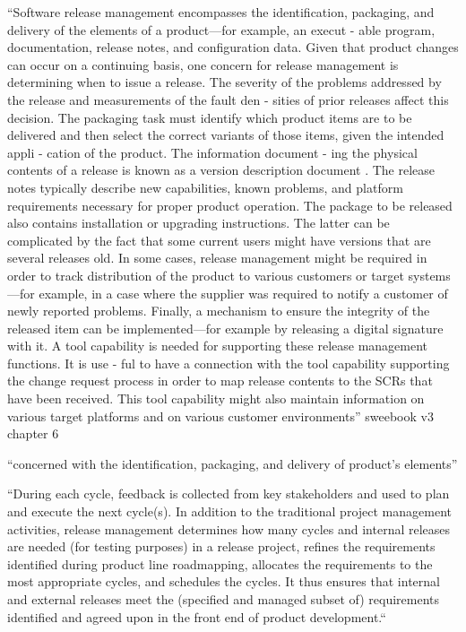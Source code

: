 ``Software  release  management  encompasses  the  
identification,  packaging,  and  delivery  of  the 
elements  of  a  product—for  example,  an  execut
-
able program, documentation, release notes, and 
configuration  data.  Given  that  product  changes 
can occur on a continuing basis, one concern for 
release management is determining when to issue 
a release. The severity of the problems addressed 
by the release and measurements of the fault den
-
sities  of  prior  releases  affect  this  decision.  The  
packaging task must identify which product items 
are  to  be  delivered  and  then  select  the  correct  
variants of those items, given the intended appli
-
cation of the product. The information document
-
ing  the  physical  contents  of  a  release  is  known  
as  a  version  description  document
.
  The  release  
notes typically describe new capabilities, known 
problems,  and  platform  requirements  necessary  
for proper product operation. The package to be 
released  also  contains  installation  or  upgrading  
instructions. The latter can be complicated by the 
fact that some current users might have versions 
that are several releases old. In some cases, release 
management might be required in order to track 
distribution  of  the  product  to  various  customers  
or target systems—for example, in a case where 
the supplier was required to notify a customer of 
newly  reported  problems.  Finally,  a  mechanism  
to ensure the integrity of the released item can be 
implemented—for example by releasing a digital 
signature with it.
  A  tool  capability  is  needed  for  supporting  
these  release  management  functions.  It  is  use
-
ful to have a connection with the tool capability 
supporting the change request process in order to 
map release contents to the SCRs that have been 
received. This tool capability might also maintain 
information  on  various  target  platforms  and  on  
various customer environments'' sweebook v3 chapter 6 \citep{Society2014}

 
 ``concerned with the identification, packaging, and delivery of product’s elements'' \citep{KakolaKoivulahtiOjala_et_al2010}
 
 
 
``During each
cycle, feedback is collected from key stakeholders and used to plan and execute the next cycle(s).
In addition to the traditional project management activities, release management determines how
many cycles and internal releases are needed (for testing purposes) in a release project, refines the
requirements identified during product line roadmapping, allocates the requirements to the most
appropriate cycles, and schedules the cycles. It thus ensures that internal and external releases
meet the (specified and managed subset of) requirements identified and agreed upon in the front
end of product development.`` \citep{KakolaKoivulahtiOjala_et_al2010}



